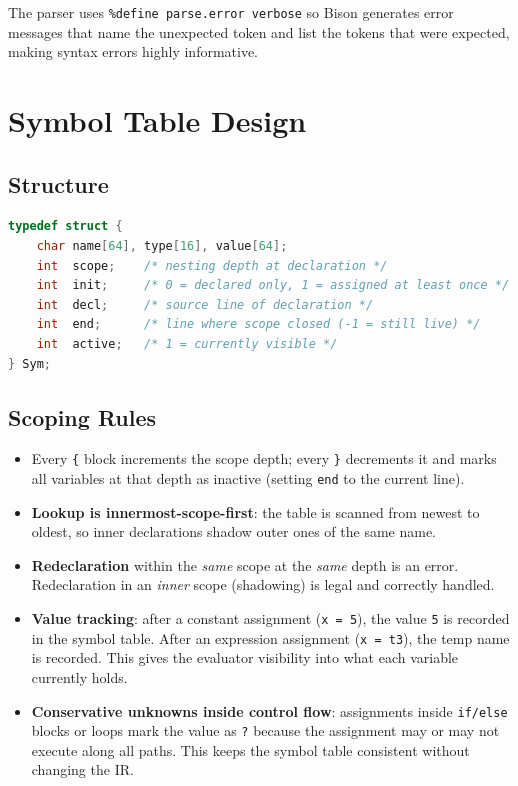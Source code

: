 \documentclass[11pt]{article}
\begin{document}
The parser uses \texttt{\%define parse.error verbose} so Bison generates error messages that name the unexpected token and list the tokens that were expected, making syntax errors highly informative.

\section{Symbol Table Design}

\subsection{Structure}

\begin{lstlisting}[style=cstyle, language=C]
typedef struct {
    char name[64], type[16], value[64];
    int  scope;    /* nesting depth at declaration */
    int  init;     /* 0 = declared only, 1 = assigned at least once */
    int  decl;     /* source line of declaration */
    int  end;      /* line where scope closed (-1 = still live) */
    int  active;   /* 1 = currently visible */
} Sym;
\end{lstlisting}

\subsection{Scoping Rules}

\begin{itemize}
    \item Every \texttt{\{} block increments the scope depth; every \texttt{\}} decrements it and marks all variables at that depth as inactive (setting \texttt{end} to the current line).
    \item \textbf{Lookup is innermost-scope-first}: the table is scanned from newest to oldest, so inner declarations shadow outer ones of the same name.
    \item \textbf{Redeclaration} within the \emph{same} scope at the \emph{same} depth is an error. Redeclaration in an \emph{inner} scope (shadowing) is legal and correctly handled.
    \item \textbf{Value tracking}: after a constant assignment (\texttt{x = 5}), the value \texttt{5} is recorded in the symbol table. After an expression assignment (\texttt{x = t3}), the temp name is recorded. This gives the evaluator visibility into what each variable currently holds.
    \item \textbf{Conservative unknowns inside control flow}: assignments inside \texttt{if/else} blocks or loops mark the value as \texttt{?} because the assignment may or may not execute along all paths. This keeps the symbol table consistent without changing the IR.
\end{itemize}
\end{document}
